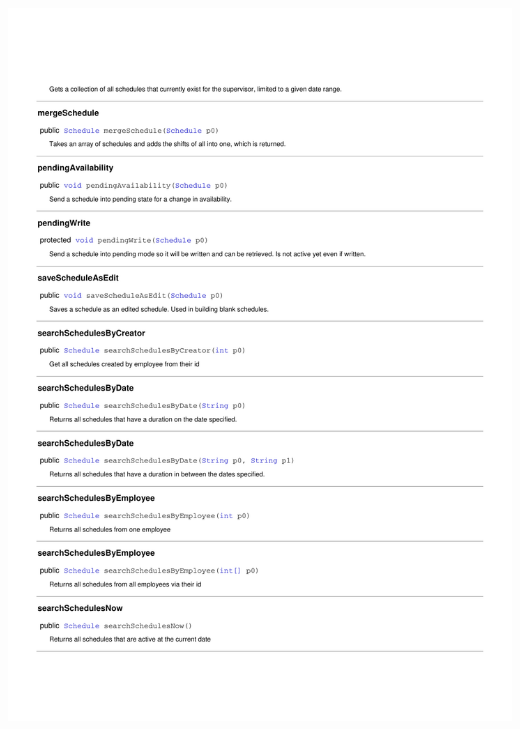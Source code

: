 \documentclass[letterpaper,12pt]{report}
\begin{document}
\includegraphics[scale=0.9,trim=20mm 30mm 25mm 25mm]{externals/PersistanceDataDictionary6.pdf}
\newpage
\end{document}
